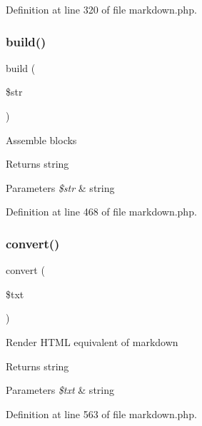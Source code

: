 Definition at line 320 of file markdown.\+php.

\hypertarget{class_markdown_aeafac9b9cffe924ba0f859a6bfb8aa85}{}\label{class_markdown_aeafac9b9cffe924ba0f859a6bfb8aa85} 
\subsubsection{\texorpdfstring{build()}{build()}}
{\footnotesize\ttfamily build (\begin{DoxyParamCaption}\item[{}]{\$str }\end{DoxyParamCaption})\hspace{0.3cm}{\ttfamily [protected]}}

Assemble blocks \begin{DoxyReturn}{Returns}
string 
\end{DoxyReturn}

\begin{DoxyParams}{Parameters}
{\em \$str} & string \\
\hline
\end{DoxyParams}


Definition at line 468 of file markdown.\+php.

\hypertarget{class_markdown_a64ffc5ca8440ddf7e0f3b3f03c16edf2}{}\label{class_markdown_a64ffc5ca8440ddf7e0f3b3f03c16edf2} 
\subsubsection{\texorpdfstring{convert()}{convert()}}
{\footnotesize\ttfamily convert (\begin{DoxyParamCaption}\item[{}]{\$txt }\end{DoxyParamCaption})}

Render H\+T\+ML equivalent of markdown \begin{DoxyReturn}{Returns}
string 
\end{DoxyReturn}

\begin{DoxyParams}{Parameters}
{\em \$txt} & string \\
\hline
\end{DoxyParams}


Definition at line 563 of file markdown.\+php.

\hypertarget{class_markdown_a5c55a8c8fce867d0889971aaaf590040}{}\label{class_markdown_a5c55a8c8fce867d0889971aaaf590040} 
